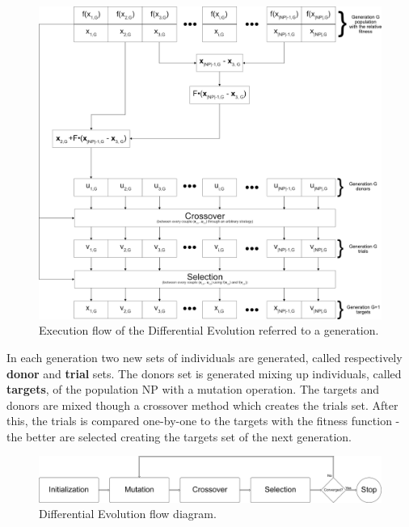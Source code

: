 \begin{figure}[h]
	\centering
	\includegraphics[width=\textwidth]{figures/de-flow-complete.png}
	\caption{Execution flow of the Differential Evolution referred to a generation.}
	\label{fig:bin-crossover}
\end{figure}
In each generation two new sets of individuals are generated, called respectively \textbf{donor} and \textbf{trial} sets. The donors set is generated mixing up individuals, called \textbf{targets}, of the population NP with a mutation operation. The targets and donors are mixed though a crossover method which creates the trials set. After this, the trials is compared one-by-one to the targets with the fitness function - the better are selected creating the targets set of the next generation. \\

\begin{figure}[t]
	\centering
	\includegraphics[width=\textwidth]{figures/de-flow.png}
	\caption{Differential Evolution flow diagram.}
\end{figure}

